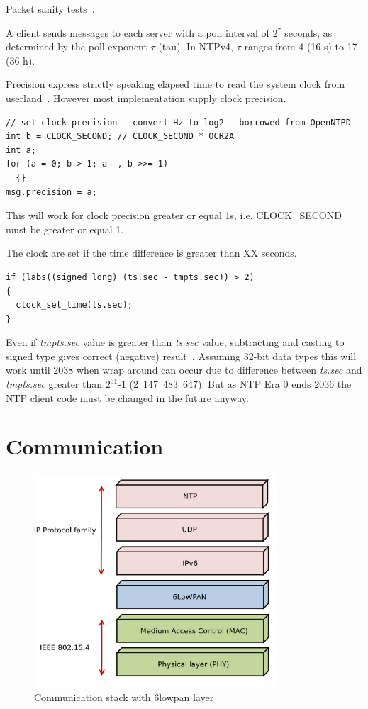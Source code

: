 Packet sanity tests~\cite{ntp-arch}.

A client sends messages to each server with a poll interval of $2^{\tau}$
seconds, as determined by the poll exponent $\tau$ (tau).
In NTPv4, $\tau$ ranges from 4 (16 s) to 17 (36 h).


Precision express strictly speaking elapsed time to read the system clock from userland~\cite{ntp-arch}.
However most implementation supply clock precision.
\begin{lstlisting}
// set clock precision - convert Hz to log2 - borrowed from OpenNTPD
int b = CLOCK_SECOND; // CLOCK_SECOND * OCR2A
int a;
for (a = 0; b > 1; a--, b >>= 1)
  {}
msg.precision = a;
\end{lstlisting}
This will work for clock precision greater or equal 1s, i.e. CLOCK\_SECOND must be greater or equal 1.

The clock are set if the time difference is greater than XX seconds. %
\begin{lstlisting}
if (labs((signed long) (ts.sec - tmpts.sec)) > 2)
{
  clock_set_time(ts.sec);
}
\end{lstlisting}
Even if {\it{tmpts.sec}} value is greater than {\it{ts.sec}} value,
subtracting and casting to signed type gives correct (negative) result~\cite{c99}.
Assuming 32-bit data types this will work until 2038 when wrap around can occur due to difference
between {\it{ts.sec}} and {\it{tmpts.sec}} greater than $2^{31}$-1 (2~147~483~647).
But as NTP Era 0 ends 2036 the NTP client code must be changed in the future anyway.


\section{Communication}
\begin{figure}
  \centering
  \includegraphics[width=9cm,keepaspectratio]{fig/6lowpan.pdf}
  \caption{Communication stack with 6lowpan layer}
  \label{fig:implementation-6lowpan}
  \bigskip
\end{figure}

